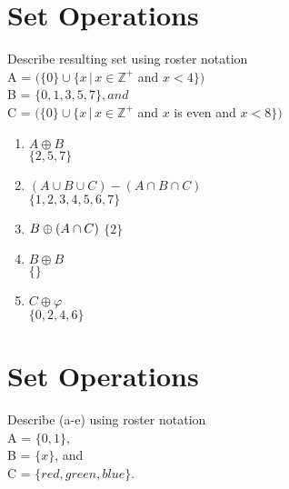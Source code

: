 \documentclass[a4paper]{article}
\begin{document}
\section{Set Operations}
Describe resulting set using roster notation \\
\hspace*{10mm} A = $(\{0\} \cup \{x \, | \, x \in \mathbb{Z}^+$ and $x < 4\})$ \\
\hspace*{10mm} B = $\{0, 1, 3, 5, 7\}, and$ \\
\hspace*{10mm} C = $(\{0\} \cup \{x \, | \, x \in \mathbb{Z}^+$ and $x$ is even and $x < 8\})$

\begin{enumerate}
    \item \boldmath $A \oplus B$ \unboldmath \\
    $\{2, 5, 7\}$
    \item \boldmath $(A \cup B \cup C) - (A \cap B \cap C)$ \unboldmath \\
    $\{1, 2, 3, 4, 5, 6, 7\}$
    \item \boldmath $B \oplus (A \cap C)\\
    $ \unboldmath $\{2\}$
    \item \boldmath $B \oplus B$ \unboldmath \\
    $\{\}$
    \item \boldmath $C \oplus \varphi$ \unboldmath \\
    $\{0, 2, 4, 6\}$
\end{enumerate}

\bigskip %

\section{Set Operations}
Describe (a-e) using roster notation \\
\hspace*{10mm} A = $\{0, 1\}$, \\
\hspace*{10mm} B = $\{x\}$, and \\
\hspace*{10mm} C = $\{red, green, blue\}$. \\
\end{document}

